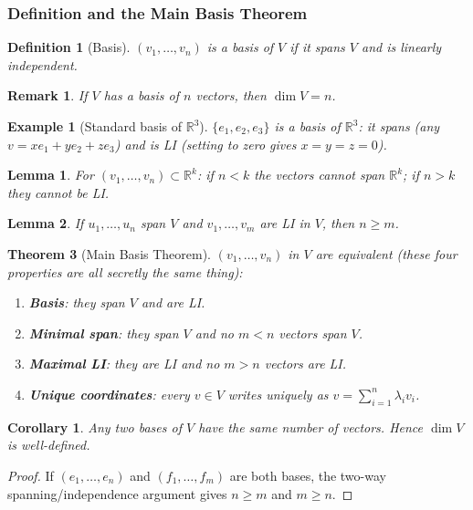 \documentclass{article}
\newtheorem{theorem}{Theorem}
\newtheorem{corollary}{Corollary}[theorem]
\newtheorem{lemma}[theorem]{Lemma}
\newtheorem{definition}{Definition}
\newtheorem*{example}{Example}
\newtheorem{remark}{Remark}
\begin{document}
\subsubsection{Definition and the Main Basis Theorem}
\begin{definition}[Basis]
    $(v_1,\ldots,v_n)$ is a basis of $V$ if it spans $V$ and is linearly independent.
\end{definition}
\begin{remark}
    If $V$ has a basis of $n$ vectors, then $\dim V = n$.
\end{remark}
\begin{example}[Standard basis of $\mathbb{R}^3$]
    $\{e_1,e_2,e_3\}$ is a basis of $\mathbb{R}^3$: it spans (any $v=xe_1+ye_2+ze_3$) and is LI (setting to zero gives $x=y=z=0$).
\end{example}
\begin{lemma}
    For $(v_1,\ldots,v_n)\subset \mathbb{R}^k$: if $n<k$ the vectors cannot span $\mathbb{R}^k$; if $n>k$ they cannot be LI.
\end{lemma}
\begin{lemma}
    If $u_1,\ldots,u_n$ span $V$ and $v_1,\ldots,v_m$ are LI in $V$, then $n\ge m$.
\end{lemma}
\begin{theorem}[Main Basis Theorem]
    $(v_1,\ldots,v_n)$ in $V$ are equivalent (these four properties are all secretly the same thing):
    \begin{enumerate}
        \item \textbf{Basis}: they span $V$ and are LI.
        \item \textbf{Minimal span}: they span $V$ and no $m<n$ vectors span $V$.
        \item \textbf{Maximal LI}: they are LI and no $m>n$ vectors are LI.
        \item \textbf{Unique coordinates}: every $v\in V$ writes uniquely as $v = \sum_{i=1}^n\lambda_iv_i$.
    \end{enumerate}
\end{theorem}
\begin{corollary}
    Any two bases of $V$ have the same number of vectors. Hence $\dim V$ is well-defined.
\end{corollary}
\begin{proof}
    If $(e_1,\ldots,e_n)$ and $(f_1,\ldots,f_m)$ are both bases, the two-way spanning/independence argument gives $n\ge m$ and $m\ge n$.
\end{proof}
\end{document}
